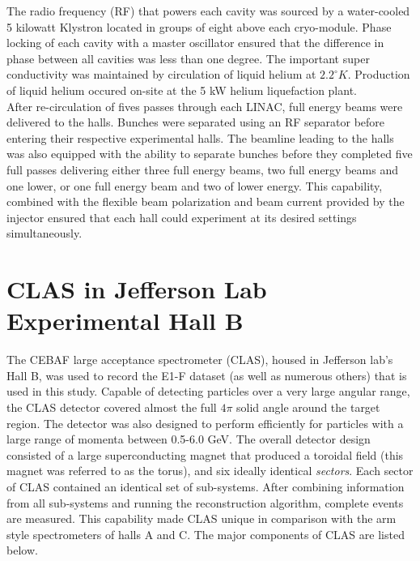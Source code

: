 The radio frequency (RF) that powers each cavity was sourced by a water-cooled 5 kilowatt Klystron located in groups of eight above each cryo-module.  Phase locking of each cavity with a master oscillator ensured that the difference in phase between all cavities was less than one degree. The important super conductivity was maintained by circulation of liquid helium at $2.2^\circ K$.  Production of liquid helium occured on-site at the 5 kW helium liquefaction plant.  \\

After re-circulation of fives passes through each LINAC, full energy beams were delivered to the halls.  Bunches were separated using an RF separator before entering their respective experimental halls.  The beamline leading to the halls was also equipped with the ability to separate bunches before they completed five full passes delivering either three full energy beams, two full energy beams and one lower, or one full energy beam and two of lower energy.  This capability, combined with the flexible beam polarization and beam current provided by the injector ensured that each hall could experiment at its desired settings simultaneously.  

\section{CLAS in Jefferson Lab Experimental Hall B}
The CEBAF large acceptance spectrometer (CLAS), housed in Jefferson lab's Hall B, was used to record the E1-F dataset (as well as numerous others) that is used in this study.  Capable of detecting particles over a very large angular range, the CLAS detector covered almost the full $4\pi$ solid angle around the target region.  The detector was also designed to perform efficiently for particles with a large range of momenta between 0.5-6.0 GeV.  The overall detector design consisted of a large superconducting magnet that produced a toroidal field (this magnet was referred to as the torus), and six ideally identical \textit{sectors}.  Each sector of CLAS contained an identical set of sub-systems.  After combining information from all sub-systems and running the reconstruction algorithm, complete events are measured.  This capability made CLAS unique in comparison with the arm style spectrometers of halls A and C.  The major components of CLAS are listed below.


